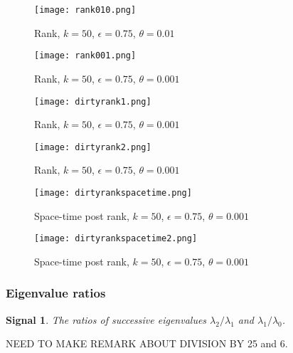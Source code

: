 \documentclass[a4paper,11pt,twoside]{article}
\newtheorem*{signals}{Signal}
\theoremstyle{definition}
\theoremstyle{remark}
\newenvironment{sigs}
   {\colorlet{shadecolor}{green!50}\begin{shaded}\begin{signals}}
   {\end{signals}\end{shaded}}
\begin{document}
\newpage
\begin{figure}[!h]
  \caption{Rank, $k=50$, $\epsilon = 0.75$, $\theta = 0.01$}
  \centering
    \texttt{[image: rank010.png]}
    \label{rank010}
\end{figure}
\begin{figure}[!h]
  \caption{Rank, $k=50$, $\epsilon = 0.75$, $\theta = 0.001$}
  \centering
    \texttt{[image: rank001.png]}
    \label{rank001}
\end{figure}
\newpage
\begin{figure}[!h]
  \caption{Rank, $k=50$, $\epsilon = 0.75$, $\theta = 0.001$}
  \centering
    \texttt{[image: dirtyrank1.png]}
    \label{dirtyrank1}
\end{figure}
\begin{figure}[!h]
  \caption{Rank, $k=50$, $\epsilon = 0.75$, $\theta = 0.001$}
  \centering
    \texttt{[image: dirtyrank2.png]}
    \label{dirtyrank2}
\end{figure}
\newpage
\begin{figure}[!h]
  \caption{Space-time post rank, $k=50$, $\epsilon = 0.75$, $\theta = 0.001$}
  \centering
    \texttt{[image: dirtyrankspacetime.png]}
    \label{dirtyrankspacetime}
\end{figure}
\begin{figure}[!h]
  \caption{Space-time post rank, $k=50$, $\epsilon = 0.75$, $\theta = 0.001$}
  \centering
    \texttt{[image: dirtyrankspacetime2.png]}
    \label{dirtyrankspacetime2}
\end{figure}
\newpage
\subsubsection{Eigenvalue ratios}\label{erats}
\begin{sigs} The ratios of successive eigenvalues $\lambda_2/\lambda_1$ and $\lambda_1/\lambda_0$.
\end{sigs}
NEED TO MAKE REMARK ABOUT DIVISION BY 25 and 6.
\end{document}
